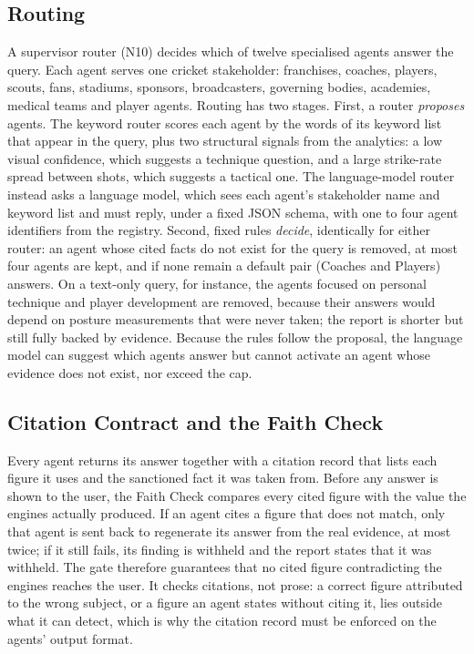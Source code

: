 \subsection{Routing}
A supervisor router (N10) decides which of twelve specialised agents answer the query. Each agent serves one cricket stakeholder: franchises, coaches, players, scouts, fans, stadiums, sponsors, broadcasters, governing bodies, academies, medical teams and player agents. Routing has two stages. First, a router \emph{proposes} agents. The keyword router scores each agent by the words of its keyword list that appear in the query, plus two structural signals from the analytics: a low visual confidence, which suggests a technique question, and a large strike-rate spread between shots, which suggests a tactical one. The language-model router instead asks a language model, which sees each agent's stakeholder name and keyword list and must reply, under a fixed JSON schema, with one to four agent identifiers from the registry. Second, fixed rules \emph{decide}, identically for either router: an agent whose cited facts do not exist for the query is removed, at most four agents are kept, and if none remain a default pair (Coaches and Players) answers. On a text-only query, for instance, the agents focused on personal technique and player development are removed, because their answers would depend on posture measurements that were never taken; the report is shorter but still fully backed by evidence. Because the rules follow the proposal, the language model can suggest which agents answer but cannot activate an agent whose evidence does not exist, nor exceed the cap.

\subsection{Citation Contract and the Faith Check}
Every agent returns its answer together with a citation record that lists each figure it uses and the sanctioned fact it was taken from. Before any answer is shown to the user, the Faith Check compares every cited figure with the value the engines actually produced. If an agent cites a figure that does not match, only that agent is sent back to regenerate its answer from the real evidence, at most twice; if it still fails, its finding is withheld and the report states that it was withheld. The gate therefore guarantees that no cited figure contradicting the engines reaches the user. It checks citations, not prose: a correct figure attributed to the wrong subject, or a figure an agent states without citing it, lies outside what it can detect, which is why the citation record must be enforced on the agents' output format.

